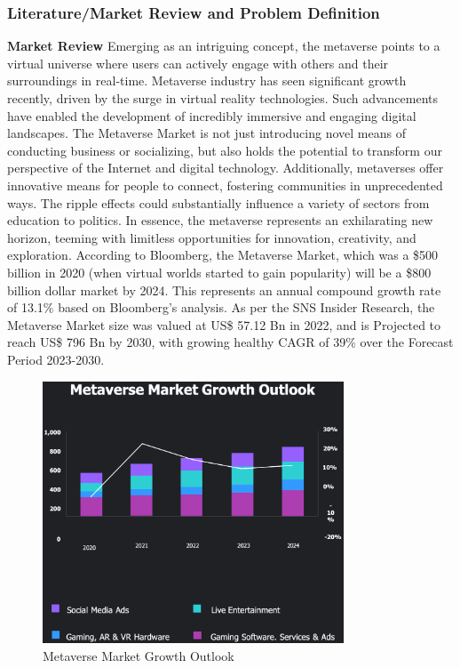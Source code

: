 \subsubsection{Literature/Market Review and Problem Definition}

\textbf{Market Review}\quad
Emerging as an intriguing concept, the metaverse points to a virtual universe where users can actively engage with others and their surroundings in real-time. 
Metaverse industry has seen significant growth recently, driven by the surge in virtual reality technologies. 
Such advancements have enabled the development of incredibly immersive and engaging digital landscapes. 
The Metaverse Market is not just introducing novel means of conducting business or socializing, but also holds the potential to transform our perspective of the Internet and digital technology. 
Additionally, metaverses offer innovative means for people to connect, fostering communities in unprecedented ways. The ripple effects could substantially influence a variety of sectors from education to politics. 
In essence, the metaverse represents an exhilarating new horizon, teeming with limitless opportunities for innovation, creativity, and exploration.
According to Bloomberg, the Metaverse Market, which was a \$500 billion in 2020 (when virtual worlds started to gain popularity) will be a \$800 billion dollar market by 2024. This represents an annual compound growth rate of 13.1\% based on Bloomberg’s analysis\cite{Tech_undated-bj}. 
As per the SNS Insider Research, the Metaverse Market size was valued at US\$ 57.12 Bn in 2022, and is Projected to reach US\$ 796 Bn by 2030, with growing healthy CAGR of 39\% over the Forecast Period 2023-2030\cite{Metaverse_Market}. 
\begin{figure}
    \centering
    \includegraphics[width=0.8\textwidth]{image/MetaverseMarketOutlook.png}
    \caption{Metaverse Market Growth Outlook}
  \label{fig:Market}
\end{figure}
